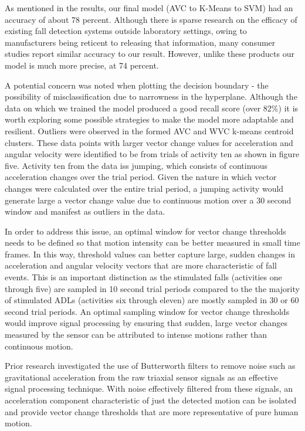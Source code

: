\documentclass{llncs}
\begin{document}
	As mentioned in the results, our final model (AVC to K-Means to SVM) had an accuracy of about 78 percent. Although there is sparse research on the efficacy of existing fall detection systems outside laboratory settings, owing to manufacturers being reticent to releasing that information, many consumer studies report similar accuracy to our result.\cite{medreview} However, unlike these products our model is much more precise, at 74 percent. 
	
	A potential concern was noted when plotting the decision boundary - the possibility of misclassification due to narrowness in the hyperplane. Although the data on which we trained the model produced a good recall score (over 82\%) it is worth exploring some possible strategies to make the model more adaptable and resilient. Outliers were observed in the formed AVC and WVC k-means centroid clusters. These data points with larger vector change values for acceleration and angular velocity were identified to be from trials of activity ten as shown in figure five. Activity ten from the data iss jumping, which consists of continuous acceleration changes over the trial period. Given the nature in which vector changes were calculated over the entire trial period, a jumping activity would generate large a vector change value due to continuous motion over a 30 second window and manifest as outliers in the data.

	In order to address this issue, an optimal window for vector change thresholds needs to be defined so that motion intensity can be better measured in small time frames. In this way, threshold values can better capture large, sudden changes in acceleration and angular velocity vectors that are more characteristic of fall events. This is an important distinction as the stimulated falls (activities one through five) are sampled in 10 second trial periods compared to the the majority of stimulated ADLs (activities six through eleven) are mostly sampled in 30 or 60 second trial periods. An optimal sampling window for vector change thresholds would improve signal processing by ensuring that sudden, large vector changes measured by the sensor can be attributed to intense motions rather than continuous motion.
	
	Prior research investigated the use of Butterworth filters to remove noise such as gravitational acceleration from the raw triaxial sensor signals as an effective signal processing technique.\cite{hussainelderly2019} With noise effectively filtered from these signals, an acceleration component characteristic of just the detected motion can be isolated and provide vector change thresholds that are more representative of pure human motion. 
\end{document}

